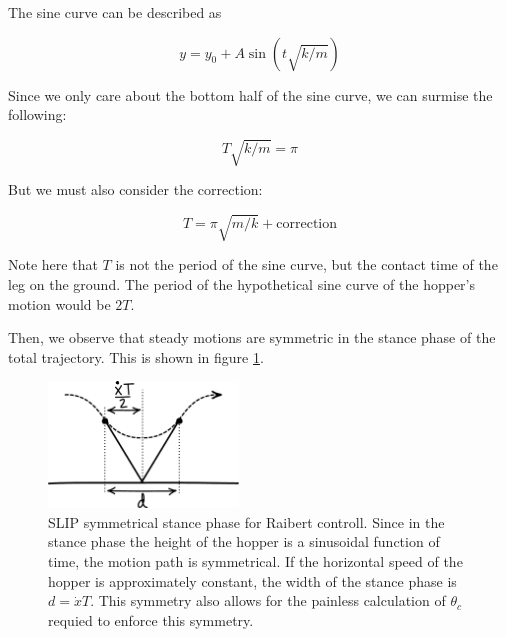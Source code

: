 The sine curve can be described as

\begin{equation}
y=y_{0}+A\sin{\left(t\sqrt{k/m}\right)}
\label{eq:SineCurve}
\end{equation}

Since we only care about the bottom half of the sine curve, we can surmise the following:

\begin{equation}
T\sqrt{k/m}=\pi
\label{eq:SineArgument}
\end{equation}

But we must also consider the correction:

\begin{equation}
T=\pi\sqrt{m/k}+\mbox{correction}
\label{eq:ContactTime}
\end{equation}

Note here that $T$ is not the period of the sine curve, but the contact time of the leg on the ground. The period of the hypothetical sine curve of the hopper's motion would be $2T$.

Then, we observe that steady motions are symmetric in the stance phase of the total trajectory. This is shown in figure \ref{fig:SLIPSymmetry}. 

\begin{figure}[h]		%
\begin{centering}
\includegraphics[width=0.45\textwidth]{Figures/SLIPSymmetry}\par
\end{centering}
\caption[Diagram: SLIP Symmetrical Stance Phase for Raibert Control]{SLIP symmetrical stance phase for Raibert controll. Since in the stance phase the height of the hopper is a sinusoidal function of time, the motion path is symmetrical. If the horizontal speed of the hopper is approximately constant, the width of the stance phase is $d = \dot{x}T$. This symmetry also allows for the painless calculation of $\theta_{c}$ requied to enforce this symmetry.}
\label{fig:SLIPSymmetry}
\end{figure}
%

